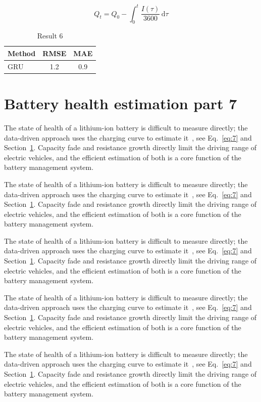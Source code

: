 \documentclass[11pt]{article}
\begin{document}
\begin{equation}\label{eq:6}
  Q_t = Q_0 - \int_0^t \frac{I(\tau)}{3600}\,\mathrm{d}\tau
\end{equation}
\begin{table}[h]\centering\begin{tabular}{lcc}\toprule Method & RMSE & MAE\\\midrule GRU & 1.2 & 0.9\\\bottomrule\end{tabular}\caption{Result 6}\end{table}

\section{Battery health estimation part 7}\label{sec:7}
The state of health of a lithium-ion battery is difficult to measure directly; the data-driven approach uses the charging curve to estimate it~\cite{a2020}, see Eq.~\eqref{eq:7} and Section~\ref{sec:7}. Capacity fade and resistance growth directly limit the driving range of electric vehicles, and the efficient estimation of both is a core function of the battery management system.

The state of health of a lithium-ion battery is difficult to measure directly; the data-driven approach uses the charging curve to estimate it~\cite{a2020}, see Eq.~\eqref{eq:7} and Section~\ref{sec:7}. Capacity fade and resistance growth directly limit the driving range of electric vehicles, and the efficient estimation of both is a core function of the battery management system.

The state of health of a lithium-ion battery is difficult to measure directly; the data-driven approach uses the charging curve to estimate it~\cite{a2020}, see Eq.~\eqref{eq:7} and Section~\ref{sec:7}. Capacity fade and resistance growth directly limit the driving range of electric vehicles, and the efficient estimation of both is a core function of the battery management system.

The state of health of a lithium-ion battery is difficult to measure directly; the data-driven approach uses the charging curve to estimate it~\cite{a2020}, see Eq.~\eqref{eq:7} and Section~\ref{sec:7}. Capacity fade and resistance growth directly limit the driving range of electric vehicles, and the efficient estimation of both is a core function of the battery management system.

The state of health of a lithium-ion battery is difficult to measure directly; the data-driven approach uses the charging curve to estimate it~\cite{a2020}, see Eq.~\eqref{eq:7} and Section~\ref{sec:7}. Capacity fade and resistance growth directly limit the driving range of electric vehicles, and the efficient estimation of both is a core function of the battery management system.
\end{document}
